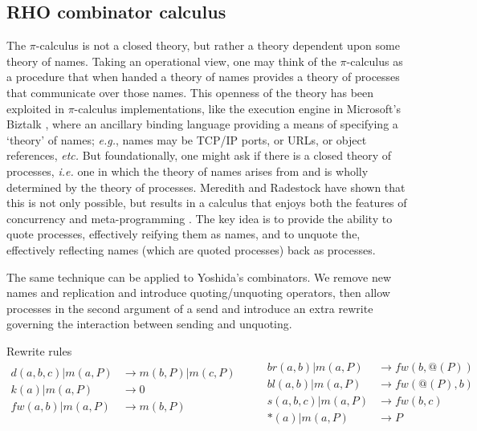 \documentclass{llncs}
\makeatletter
\newcommand{\pic}{$\pi$-calculus}
\newcommand{\scong}{\mathbin{\equiv}}
\newcommand{\quotep}[1]{\mathsf{@}#1}
\newcommand{\bc}{\mathbin{\mathbf{::=}}}
\newcommand{\bm}{\mathbin{\mathbf\mid}}
\newcommand{\red}{\rightarrow}
\makeatother
\begin{document}
\subsection{RHO combinator calculus}
The {\pic} is not a closed theory, but rather a theory dependent upon
some theory of names. Taking an operational view, one may think of the
{\pic} as a procedure that when handed a theory of names provides a
theory of processes that communicate over those names. This openness
of the theory has been exploited in {\pic} implementations, like the
execution engine in Microsoft's Biztalk \cite{biztalk}, where an
ancillary binding language providing a means of specifying a `theory'
of names; {\em e.g.}, names may be TCP/IP ports, or URLs, or object
references, {\em etc.}  But foundationally, one might ask if there is
a closed theory of processes, {\em i.e.} one in which the theory of
names arises from and is wholly determined by the theory of
processes. Meredith and Radestock have shown that this is not only
possible, but results in a calculus that enjoys both the features of
concurrency and meta-programming
\cite{DBLP:journals/entcs/MeredithR05}. The key idea is to provide the
ability to quote processes, effectively reifying them as names, and to
unquote the, effectively reflecting names (which are quoted processes)
back as processes.

The same technique can be applied to Yoshida's combinators. We remove
new names and replication and introduce quoting/unquoting operators,
then allow processes in the second argument of a send and introduce an
extra rewrite governing the interaction between sending and unquoting.


Rewrite rules
\[\begin{array}{rl}
  d(a,b,c) | m(a,P) & \red m(b,P) | m(c,P) \\
  k(a) | m(a,P) & \red 0 \\
  fw(a,b) | m(a,P) & \red m(b,P) \\
\end{array} \quad \quad
\begin{array}{rl}
  br(a,b) | m(a,P) & \red fw(b,@(P)) \\
  bl(a,b) | m(a,P) & \red fw(@(P),b) \\
  s(a,b,c) | m(a,P) & \red fw(b,c) \\
  *(a) | m(a,P) & \red P
\end{array}\]
\end{document}
